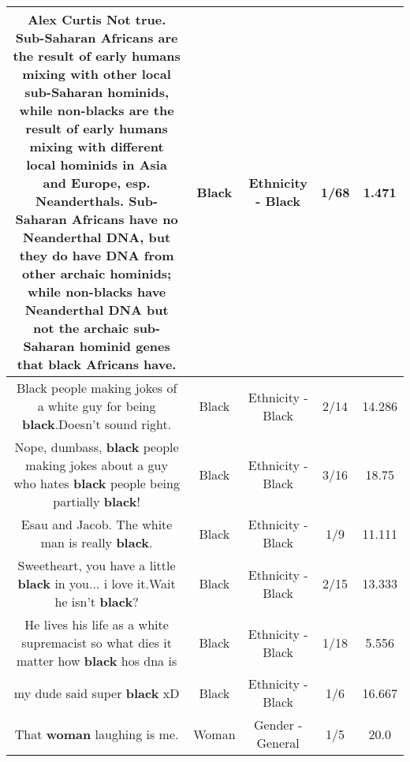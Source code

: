\documentclass[11pt]{article}
\newlength\mylength
\begin{document}
\begin{center}
\begin{longtable}{|C{.65\mylength}|C{.30\mylength}|C{.12\mylength}|C{.12\mylength}|C{.12\mylength}|}
  \small Alex Curtis Not true. Sub-Saharan Africans are the result of early humans mixing with other local sub-Saharan hominids, while non-blacks are the result of early humans mixing with different local hominids in Asia and Europe, esp. Neanderthals. Sub-Saharan Africans have no Neanderthal DNA, but they do have DNA from other archaic hominids; while non-blacks have Neanderthal DNA but not the archaic sub-Saharan hominid genes that \textbf{black} Africans have.\normalsize   & Black & Ethnicity - Black & 1/68 & 1.471 \\  \hline
  \small Black people making jokes of a white guy for being \textbf{black}.Doesn't sound right.\normalsize   & Black & Ethnicity - Black & 2/14 & 14.286 \\  \hline
  \small Nope, dumbass, \textbf{black} people making jokes about a guy who hates \textbf{black} people being partially \textbf{black}!\normalsize   & Black & Ethnicity - Black & 3/16 & 18.75 \\  \hline
  \small Esau and Jacob. The white man is really \textbf{black}.\normalsize   & Black & Ethnicity - Black & 1/9 & 11.111 \\  \hline
  \small Sweetheart, you have a little \textbf{black} in you... i love it.Wait he isn't \textbf{black}?\normalsize   & Black & Ethnicity - Black & 2/15 & 13.333 \\  \hline
  \small He lives his life as a white supremacist so what dies it matter how \textbf{black} hos dna is\normalsize   & Black & Ethnicity - Black & 1/18 & 5.556 \\  \hline
  \small my dude said super \textbf{black} xD\normalsize   & Black & Ethnicity - Black & 1/6 & 16.667 \\  \hline
  \small That \textbf{woman} laughing is me.\normalsize   & Woman & Gender - General & 1/5 & 20.0 \\  \hline

\end{longtable}
\end{center}
\end{document}
